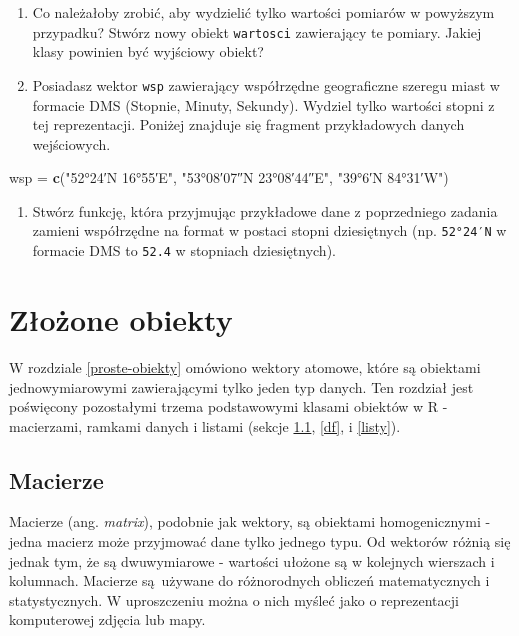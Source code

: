 \documentclass[paper=6in:9in,pagesize=pdftex,headinclude=on,footinclude=on,10pt]{scrbook}
\newenvironment{Shaded}{\begin{snugshade}}{\end{snugshade}}
\newcommand{\KeywordTok}[1]{\textcolor[rgb]{0.13,0.29,0.53}{\textbf{#1}}}
\newcommand{\NormalTok}[1]{#1}
\newcommand{\StringTok}[1]{\textcolor[rgb]{0.31,0.60,0.02}{#1}}
\providecommand{\tightlist}{%
  \setlength{\itemsep}{0pt}\setlength{\parskip}{0pt}}
\begin{document}
\begin{enumerate}
\def\labelenumi{\arabic{enumi})}
\setcounter{enumi}{4}
\tightlist
\item
  Co należałoby zrobić, aby wydzielić tylko wartości pomiarów w powyższym przypadku?
  Stwórz nowy obiekt \texttt{wartosci} zawierający te pomiary.
  Jakiej klasy powinien być wyjściowy obiekt?
\item
  Posiadasz wektor \texttt{wsp} zawierający współrzędne geograficzne szeregu miast w formacie DMS (Stopnie, Minuty, Sekundy).
  Wydziel tylko wartości stopni z tej reprezentacji.
  Poniżej znajduje się fragment przykładowych danych wejściowych.
\end{enumerate}

\begin{Shaded}
\begin{Highlighting}[]
\NormalTok{wsp =}\StringTok{ }\KeywordTok{c}\NormalTok{(}\StringTok{"52°24′N 16°55′E"}\NormalTok{, }\StringTok{"53°08′07″N 23°08′44″E"}\NormalTok{, }\StringTok{"39°6′N 84°31′W"}\NormalTok{)}
\end{Highlighting}
\end{Shaded}

\begin{enumerate}
\def\labelenumi{\arabic{enumi})}
\setcounter{enumi}{6}
\tightlist
\item
  Stwórz funkcję, która przyjmując przykładowe dane z poprzedniego zadania zamieni współrzędne na format w postaci stopni dziesiętnych (np. \texttt{52°24′N} w formacie DMS to \texttt{52.4} w stopniach dziesiętnych).
\end{enumerate}

\hypertarget{zlozone-obiekty}{%
\chapter{Złożone obiekty}\label{zlozone-obiekty}}

W rozdziale \ref{proste-obiekty} omówiono wektory atomowe, które są obiektami jednowymiarowymi zawierającymi tylko jeden typ danych.
Ten rozdział jest poświęcony pozostałymi trzema podstawowymi klasami obiektów w R - macierzami, ramkami danych i listami (sekcje \ref{macierze}, \ref{df}, i \ref{listy}).

\hypertarget{macierze}{%
\section{Macierze}\label{macierze}}

Macierze (ang. \emph{matrix}), podobnie jak wektory, są obiektami homogenicznymi - jedna macierz może przyjmować dane tylko jednego typu.
Od wektorów różnią się jednak tym, że są dwuwymiarowe - wartości ułożone są w kolejnych wierszach i kolumnach.
Macierze są~używane do różnorodnych obliczeń matematycznych i statystycznych.
W uproszczeniu można o nich myśleć jako o reprezentacji komputerowej zdjęcia lub mapy.
\end{document}
